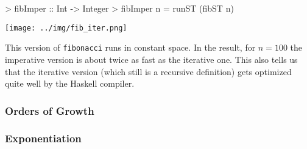 \documentclass{scrartcl}
\numberwithin{equation}{section}
\begin{document}
\begin{haskellcode}

> fibImper :: Int -> Integer
> fibImper n = runST (fibST n)

\end{haskellcode}

\texttt{[image: ../img/fib\_iter.png]}

This version of \texttt{fibonacci} runs in constant space. In the result, for $n=100$ the imperative version is about twice as fast as the iterative one. This also tells us that the iterative version (which still is a recursive definition) gets optimized quite well by the Haskell compiler.

\subsubsection{Orders of Growth}

\subsubsection{Exponentiation}

\printbibliography
\end{document}
